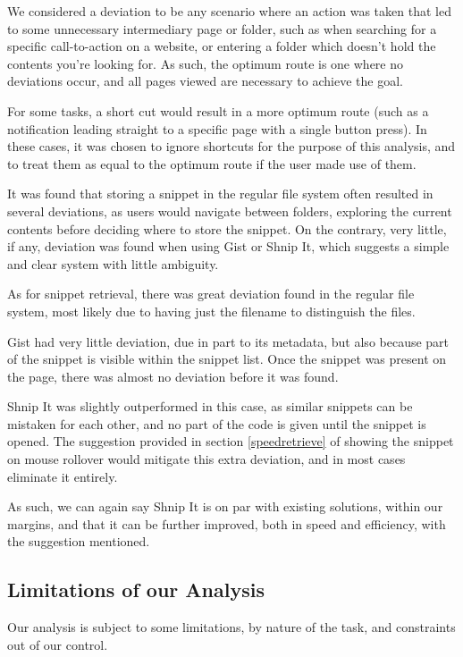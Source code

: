 We considered a deviation to be any scenario where an action was taken that led to some unnecessary intermediary page or folder, such as when searching for a specific call-to-action on a website, or entering a folder which doesn't hold the contents you're looking for.
As such, the optimum route is one where no deviations occur, and all pages viewed are necessary to achieve the goal.

For some tasks, a short cut would result in a more optimum route (such as a notification leading straight to a specific page with a single button press). In these cases, it was chosen to ignore shortcuts for the purpose of this analysis, and to treat them as equal to the optimum route if the user made use of them.

It was found that storing a snippet in the regular file system often resulted in several deviations, as users would navigate between folders, exploring the current contents before deciding where to store the snippet.
On the contrary, very little, if any, deviation was found when using Gist or Shnip It, which suggests a simple and clear system with little ambiguity.

As for snippet retrieval, there was great deviation found in the regular file system, most likely due to having just the filename to distinguish the files. 

Gist had very little deviation, due in part to its metadata, but also because part of the snippet is visible within the snippet list.
Once the snippet was present on the page, there was almost no deviation before it was found.

Shnip It was slightly outperformed in this case, as similar snippets can be mistaken for each other, and no part of the code is given until the snippet is opened.
The suggestion provided in section \ref{speedretrieve} of showing the snippet on mouse rollover would mitigate this extra deviation, and in most cases eliminate it entirely.

As such, we can again say Shnip It is on par with existing solutions, within our margins, and that it can be further improved, both in speed and efficiency, with the suggestion mentioned.

\subsection{Limitations of our Analysis}
Our analysis is subject to some limitations, by nature of the task, and constraints out of our control.

